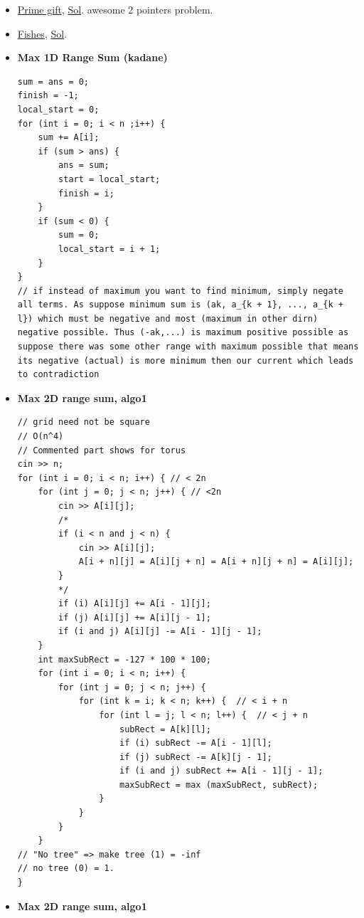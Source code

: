 \documentclass[8pt, a4paper, oneside, twocolumn]{extarticle}
\begin{document}
\begin{itemize}
    \item \href {https://codeforces.com/contest/912/problem/E}{Prime gift}, \href {https://codeforces.com/contest/912/submission/33976448}{Sol}. awesome 2 pointers problem.
    \item \href {https://codeforces.com/contest/912/problem/D}{Fishes}, \href {https://codeforces.com/blog/entry/56920}{Sol}. 
    \item \textbf{Max 1D Range Sum (kadane)}
    \begin{verbatim}
sum = ans = 0;
finish = -1;
local_start = 0;
for (int i = 0; i < n ;i++) {
    sum += A[i];
    if (sum > ans) {
        ans = sum;
        start = local_start;
        finish = i;
    }
    if (sum < 0) {
        sum = 0;
        local_start = i + 1;
    }
}
// if instead of maximum you want to find minimum, simply negate all terms. As suppose minimum sum is (ak, a_{k + 1}, ..., a_{k + l}) which must be negative and most (maximum in other dirn) negative possible. Thus (-ak,...) is maximum positive possible as suppose there was some other range with maximum possible that means its negative (actual) is more minimum then our current which leads to contradiction
    \end{verbatim}
    \item \textbf{Max 2D range sum, algo1}
    \begin{verbatim}
// grid need not be square
// O(n^4)
// Commented part shows for torus
cin >> n;
for (int i = 0; i < n; i++) { // < 2n
    for (int j = 0; j < n; j++) { // <2n
        cin >> A[i][j]; 
        /*
        if (i < n and j < n) {
            cin >> A[i][j];
            A[i + n][j] = A[i][j + n] = A[i + n][j + n] = A[i][j];
        }
        */
        if (i) A[i][j] += A[i - 1][j];
        if (j) A[i][j] += A[i][j - 1];
        if (i and j) A[i][j] -= A[i - 1][j - 1];
    }
    int maxSubRect = -127 * 100 * 100;
    for (int i = 0; i < n; i++) {
        for (int j = 0; j < n; j++) {
            for (int k = i; k < n; k++) {  // < i + n
                for (int l = j; l < n; l++) {  // < j + n
                    subRect = A[k][l];
                    if (i) subRect -= A[i - 1][l];
                    if (j) subRect -= A[k][j - 1];
                    if (i and j) subRect += A[i - 1][j - 1];
                    maxSubRect = max (maxSubRect, subRect);
                }
            }
        }
    }
// "No tree" => make tree (1) = -inf
// no tree (0) = 1.
}
    \end{verbatim}
    \item \textbf{Max 2D range sum, algo1} 

\end{itemize}
\end{document}
